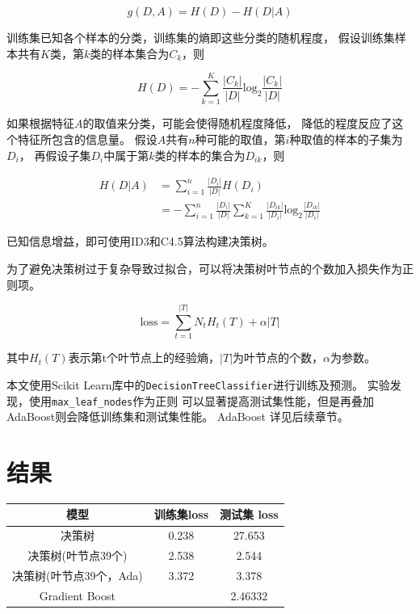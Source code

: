 \documentclass[a4paper, twocolumn]{article}
\begin{document}
\begin{equation}
    g(D, A) = H(D) - H(D|A)
\end{equation}

训练集已知各个样本的分类，训练集的熵即这些分类的随机程度，
假设训练集样本共有$K$类，第$k$类的样本集合为$C_k$，则

\begin{equation}
    H(D) = -\sum_{k=1}^K\frac{|C_k|}{|D|}\mathrm{log}_2\frac{|C_k|}{|D|}
\end{equation}

如果根据特征$A$的取值来分类，可能会使得随机程度降低，
降低的程度反应了这个特征所包含的信息量。
假设$A$共有$n$种可能的取值，第$i$种取值的样本的子集为$D_i$，
再假设子集$D_i$中属于第$k$类的样本的集合为$D_{ik}$，则

\begin{equation}
    \begin{split}
        H(D|A) &= \sum_{i=1}^n\frac{|D_i|}{|D|}H(D_i) \\
               &= -\sum_{i=1}^n\frac{|D_i|}{|D|}\sum_{k=1}^K\frac{|D_{ik}|}{|D_i|}\mathrm{log}_2\frac{|D_{ik}|}{|D_i|}
    \end{split}
\end{equation}

已知信息增益，即可使用ID3和C4.5算法构建决策树\cite{statistics}。

为了避免决策树过于复杂导致过拟合，可以将决策树叶节点的个数加入损失作为正则项。

\begin{equation}
    \mathrm{loss} = \sum_{t=1}^{|T|}N_tH_t(T)+\alpha|T|
\end{equation}

其中$H_t(T)$表示第t个叶节点上的经验熵，$|T|$为叶节点的个数，$\alpha$为参数。

本文使用Scikit Learn库中的\lstinline[basicstyle=\ttfamily]|DecisionTreeClassifier|进行训练及预测\cite{scikit}。
实验发现，使用\lstinline[basicstyle=\ttfamily]|max_leaf_nodes|作为正则
可以显著提高测试集性能，但是再叠加AdaBoost则会降低训练集和测试集性能。
AdaBoost 详见后续章节。


\section{结果}

\begin{table}[h]
    \centering
    \begin{tabular}{ccc}
        \hline
        模型& 训练集loss& 测试集 loss \\
        \hline
        决策树& 0.238& 27.653 \\
        决策树(叶节点39个)& 2.538& 2.544 \\
        决策树(叶节点39个，Ada)& 3.372& 3.378 \\
        Gradient Boost& & 2.46332 \\
        \hline
    \end{tabular}
\end{table}

{}

\end{document}
